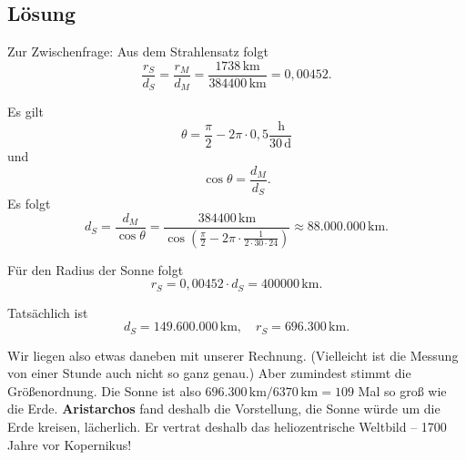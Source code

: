 \documentclass{scrartcl}
\newcommand{\RM}{r_M} %
\newcommand{\RS}{r_S} %
\newcommand{\DM}{d_M} %
\newcommand{\DS}{d_S} %
\newcommand{\person}[1]{\textbf{#1}} %
\newcommand{\km}{\,\mathrm{km}} %
\newcommand{\hour}{\,\mathrm{h}} %
\newcommand{\days}{\,\mathrm{d}} %
\begin{document}
  \newpage
  \subsection{Lösung}

  Zur Zwischenfrage: Aus dem Strahlensatz folgt
  \[ \frac{\RS}{\DS} = \frac{\RM}{\DM} = \frac{1738 \km}{384400 \km} = 0,00452. \]

  Es gilt
  \[ \theta = \frac{\pi}{2} - 2\pi \cdot 0,5 \frac{\hour}{30 \days} \]
  und
  \[ \cos \theta = \frac{\DM}{\DS}. \]
  Es folgt
  \[ \DS = \frac{\DM}{\cos \theta} = \frac{384400 \km}{\cos(\frac{\pi}{2} - 2\pi \cdot \frac{1}{2 \cdot 30 \cdot 24})} \approx 88.000.000 \km. \]

  Für den Radius der Sonne folgt
  \[ \RS = 0,00452 \cdot \DS = 400000 \km. \]

  Tatsächlich ist
  \[
    \DS = 149.600.000 \km, \quad
    \RS = 696.300 \km.
  \]

  Wir liegen also etwas daneben mit unserer Rechnung. (Vielleicht ist die Messung von einer Stunde auch nicht so ganz genau.) Aber zumindest stimmt die Größenordnung. Die Sonne ist also $696.300 \km / 6370 \km = 109$ Mal so groß wie die Erde.
  \person{Aristarchos} fand deshalb die Vorstellung, die Sonne würde um die Erde kreisen, lächerlich. Er vertrat deshalb das heliozentrische Weltbild -- 1700 Jahre vor Kopernikus!
\end{document}
